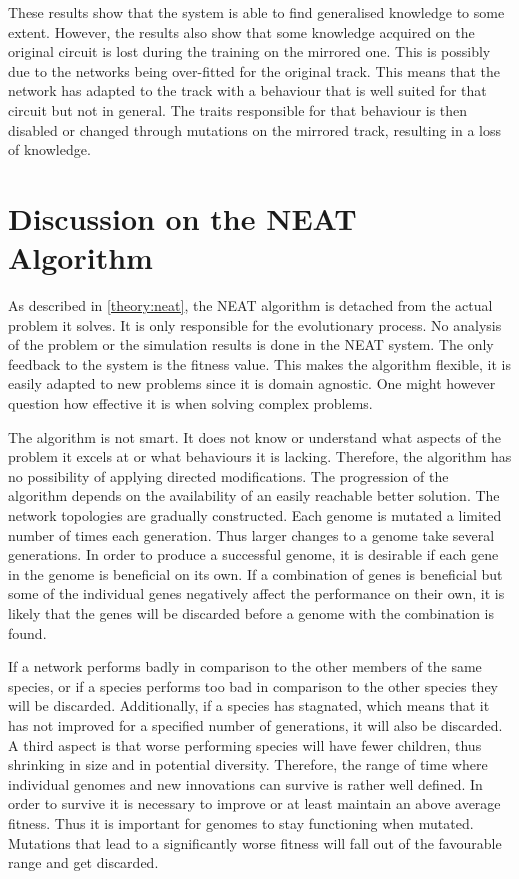 These results show that the system is able to find generalised knowledge to some extent. However, the results also show that some knowledge acquired on the original circuit is lost during the training on the mirrored one. This is possibly due to the networks being over-fitted for the original track. This means that the network has adapted to the track with a behaviour that is well suited for that circuit but not in general. The traits responsible for that behaviour is then disabled or changed through mutations on the mirrored track, resulting in a loss of knowledge.

\section{Discussion on the NEAT Algorithm}
\label{discussion:neat_mechanism}
As described in \ref{theory:neat}, the NEAT algorithm is detached from the actual problem it solves. It is only responsible for the evolutionary process. No analysis of the problem or the simulation results is done in the NEAT system. The only feedback to the system is the fitness value. This makes the algorithm flexible, it is easily adapted to new problems since it is domain agnostic. One might however question how effective it is when solving complex problems.  

The algorithm is not smart. It does not know or understand what aspects of the problem it excels at or what behaviours it is lacking. Therefore, the algorithm has no possibility of applying directed modifications. The progression of the algorithm depends on the availability of an easily reachable better solution. The network topologies are gradually constructed. Each genome is mutated a limited number of times each generation. Thus larger changes to a genome take several generations. In order to produce a successful genome, it is desirable if each gene in the genome is beneficial on its own. If a combination of genes is beneficial but some of the individual genes negatively affect the performance on their own, it is likely that the genes will be discarded before a genome with the combination is found.

If a network performs badly in comparison to the other members of the same species, or if a species performs too bad in comparison to the other species they will be discarded\cite{stanley:neat}. Additionally, if a species has stagnated, which means that it has not improved for a specified number of generations, it will also be discarded. A third aspect is that worse performing species will have fewer children, thus shrinking in size and in potential diversity. Therefore, the range of time where individual genomes and new innovations can survive is rather well defined. In order to survive it is necessary to improve or at least maintain an above average fitness. Thus it is important for genomes to stay functioning when mutated. Mutations that lead to a significantly worse fitness will fall out of the favourable range and get discarded. 

